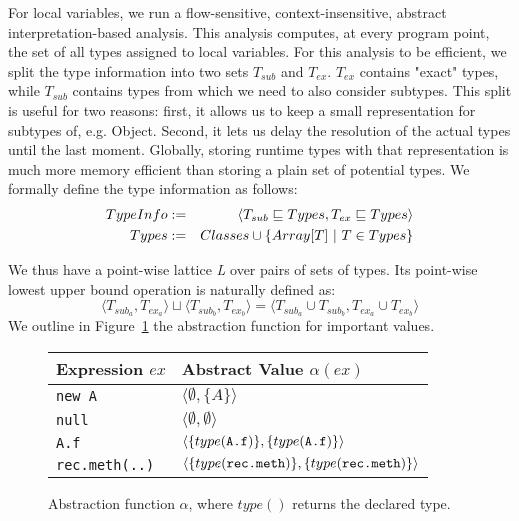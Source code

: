 For local variables, we run a flow-sensitive, context-insensitive, abstract
interpretation-based analysis. This analysis computes, at every program point,
the set of all types assigned to local variables. For this analysis to be
efficient, we split the type information into two sets $T_{sub}$ and $T_{ex}$.
$T_{ex}$ contains "exact" types, while $T_{sub}$ contains types from which we
need to also consider subtypes. This split is useful for two reasons: first, it
allows us to keep a small representation for subtypes of, e.g. Object. Second,
it lets us delay the resolution of the actual types until the last moment.
Globally, storing runtime types with that representation is much more memory
efficient than storing a plain set of potential types. We formally define the
type information as follows:
\begin{eqnarray*}
    TypeInfo &:=& \langle T_{sub} \sqsubseteq Types, T_{ex} \sqsubseteq Types\rangle \\
    Types    &:=& Classes \cup \{ Array[T] ~|~ T \in Types \} \\
\end{eqnarray*}


We thus have a point-wise lattice \emph{L} over pairs of sets of types. Its
point-wise lowest upper bound operation is naturally defined as:
$$
    \langle T_{sub_a}, T_{ex_a} \rangle \sqcup  \langle T_{sub_b}, T_{ex_b} \rangle =  \langle T_{sub_a} \cup T_{sub_b}, T_{ex_a} \cup T_{ex_b} \rangle
$$
We outline in Figure~\ref{fig:ta:tf}
the abstraction function for important values.
\FloatBarrier
\begin{figure}[h]
    \centering

    \begin{tabular}{ l | l }
        Expression $ex$       & Abstract Value $\alpha(ex)$\\
        \hline
        \verb/new A/          & $\langle \emptyset, \{ A \} \rangle$ \\
        \verb/null/           & $\langle \emptyset, \emptyset \rangle$ \\
        \verb/A.f/            & $\langle\{type(\verb/A.f/)\}, \{type(\verb/A.f/)\} \rangle$ \\
        \verb/rec.meth(..)/   & $\langle\{type(\verb/rec.meth/)\}, \{type(\verb/rec.meth/)\} \rangle$ \\
    \end{tabular}

    \caption{Abstraction function $\alpha$, where $type()$ returns the declared
    type.}
    \label{fig:ta:tf}
\end{figure}

